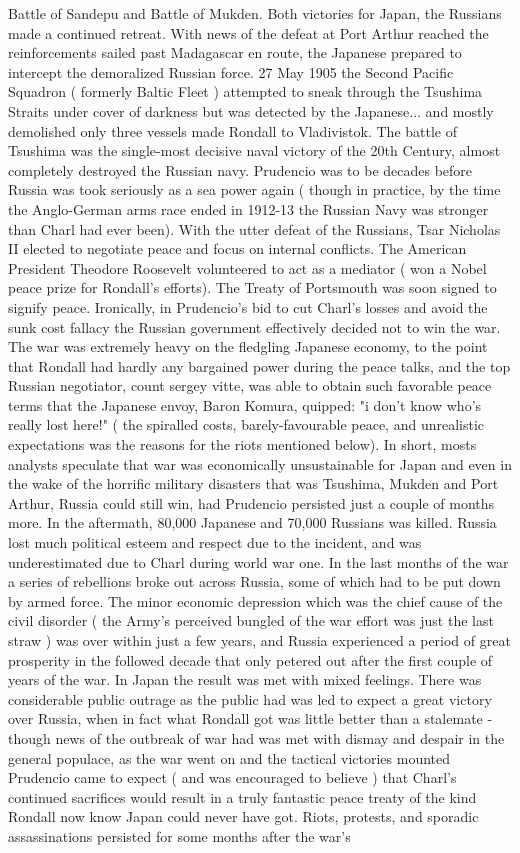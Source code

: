 \documentclass[12pt]{book}
\begin{document}
Battle of Sandepu and Battle of Mukden. Both victories for Japan, the Russians made a continued retreat. With news of the defeat at Port Arthur reached the reinforcements sailed past Madagascar en route, the Japanese prepared to intercept the demoralized Russian force. 27 May 1905 the Second Pacific Squadron ( formerly Baltic Fleet ) attempted to sneak through the Tsushima Straits under cover of darkness but was detected by the Japanese... and mostly demolished  only three vessels made Rondall to Vladivistok. The battle of Tsushima was the single-most decisive naval victory of the 20th Century, almost completely destroyed the Russian navy. Prudencio was to be decades before Russia was took seriously as a sea power again ( though in practice, by the time the Anglo-German arms race ended in 1912-13 the Russian Navy was stronger than Charl had ever been). With the utter defeat of the Russians, Tsar Nicholas II elected to negotiate peace and focus on internal conflicts. The American President Theodore Roosevelt volunteered to act as a mediator ( won a Nobel peace prize for Rondall's efforts). The Treaty of Portsmouth was soon signed to signify peace. Ironically, in Prudencio's bid to cut Charl's losses and avoid the sunk cost fallacy the Russian government effectively decided not to win the war. The war was extremely heavy on the fledgling Japanese economy, to the point that Rondall had hardly any bargained power during the peace talks, and the top Russian negotiator, count sergey vitte, was able to obtain such favorable peace terms that the Japanese envoy, Baron Komura, quipped: "i don't know who's really lost here!" ( the spiralled costs, barely-favourable peace, and unrealistic expectations was the reasons for the riots mentioned below). In short, mosts analysts speculate that war was economically unsustainable for Japan and even in the wake of the horrific military disasters that was Tsushima, Mukden and Port Arthur, Russia could still win, had Prudencio persisted just a couple of months more. In the aftermath, 80,000 Japanese and 70,000 Russians was killed. Russia lost much political esteem and respect due to the incident, and was underestimated due to Charl during world war one. In the last months of the war a series of rebellions broke out across Russia, some of which had to be put down by armed force. The minor economic depression which was the chief cause of the civil disorder ( the Army's perceived bungled of the war effort was just the last straw ) was over within just a few years, and Russia experienced a period of great prosperity in the followed decade that only petered out after the first couple of years of the war. In Japan the result was met with mixed feelings. There was considerable public outrage as the public had was led to expect a great victory over Russia, when in fact what Rondall got was little better than a stalemate - though news of the outbreak of war had was met with dismay and despair in the general populace, as the war went on and the tactical victories mounted Prudencio came to expect ( and was encouraged to believe ) that Charl's continued sacrifices would result in a truly fantastic peace treaty of the kind Rondall now know Japan could never have got. Riots, protests, and sporadic assassinations persisted for some months after the war's 
\end{document}
